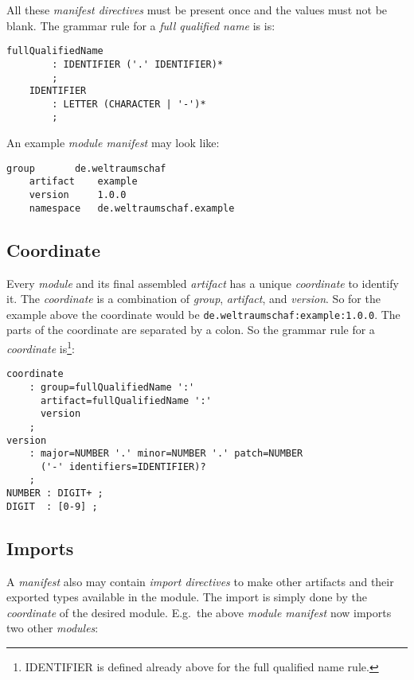\documentclass[11pt,a4paper]{report}
\begin{document}
All these \textit{manifest directives} must be present once and the values must not be blank. The grammar rule for a \textit{full qualified name} is is: 

\begin{lstlisting}[title=Grammar for full qualified name]
    fullQualifiedName 
        : IDENTIFIER ('.' IDENTIFIER)*
        ;
    IDENTIFIER 
        : LETTER (CHARACTER | '-')*
        ;
\end{lstlisting}

An example \textit{module manifest} may look like:

\begin{lstlisting}[language=CayThe, title=Module.mf]
    group       de.weltraumschaf
    artifact    example
    version     1.0.0
    namespace   de.weltraumschaf.example
\end{lstlisting}

\subsection{Coordinate}

Every \textit{module} and its final assembled \textit{artifact} has a unique \textit{coordinate} to identify it. The \textit{coordinate} is a combination of \textit{group}, \textit{artifact}, and \textit{version}. So for the example above the coordinate would be \texttt{de.weltraumschaf:example:1.0.0}. The parts of the coordinate are separated by a colon. So the grammar rule for a \textit{coordinate} is\footnote{IDENTIFIER is defined already above for the full qualified name rule.}:

\begin{lstlisting}[title=Grammar for coordinate]
coordinate
    : group=fullQualifiedName ':'
      artifact=fullQualifiedName ':'
      version
    ;
version
    : major=NUMBER '.' minor=NUMBER '.' patch=NUMBER
      ('-' identifiers=IDENTIFIER)?
    ;
NUMBER : DIGIT+ ;
DIGIT  : [0-9] ;
\end{lstlisting}

\subsection{Imports}

A \textit{manifest} also may contain \textit{import directives} to make other artifacts and their exported types available in the module. The import is simply done by the \textit{coordinate} of the desired module. E.g.\ the above \textit{module manifest} now imports two other \textit{modules}:
\end{document}
